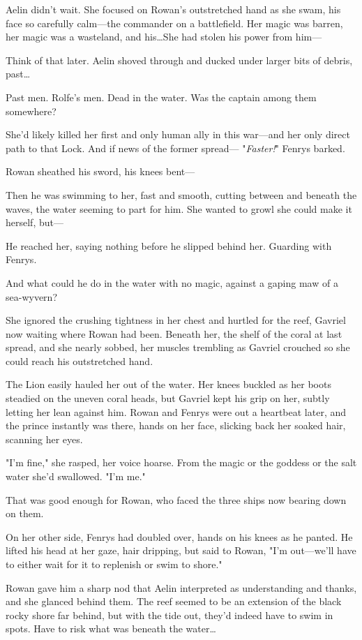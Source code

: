 Aelin didn't wait.
She focused on Rowan's outstretched hand as she swam, his face so carefully calm---the commander on a battlefield.
Her magic was barren, her magic was a wasteland, and his\ldots She had stolen his power from him---

Think of that later.
Aelin shoved through and ducked under larger bits of debris, past\ldots{}

Past men.
Rolfe's men.
Dead in the water.
Was the captain among them somewhere?

She'd likely killed her first and only human ally in this war---and her only direct path to that Lock.
And if news of the former spread--- "\emph{Faster!}" Fenrys barked.

Rowan sheathed his sword, his knees bent---

Then he was swimming to her, fast and smooth, cutting between and beneath the waves, the water seeming to part for him.
She wanted to growl she could make it herself, but---

He reached her, saying nothing before he slipped behind her.
Guarding with Fenrys.

And what could he do in the water with no magic, against a gaping maw of a sea-wyvern?

She ignored the crushing tightness in her chest and hurtled for the reef, Gavriel now waiting where Rowan had been.
Beneath her, the shelf of the coral at last spread, and she nearly sobbed, her muscles trembling as Gavriel crouched so she could reach his outstretched hand.

The Lion easily hauled her out of the water.
Her knees buckled as her boots steadied on the uneven coral heads, but Gavriel kept his grip on her, subtly letting her lean against him.
Rowan and Fenrys were out a heartbeat later, and the prince instantly was there, hands on her face, slicking back her soaked hair, scanning her eyes.

"I'm fine," she rasped, her voice hoarse.
From the magic or the goddess or the salt water she'd swallowed.
"I'm me."

That was good enough for Rowan, who faced the three ships now bearing down on them.

On her other side, Fenrys had doubled over, hands on his knees as he panted.
He lifted his head at her gaze, hair dripping, but said to Rowan, "I'm out---we'll have to either wait for it to replenish or swim to shore."

Rowan gave him a sharp nod that Aelin interpreted as understanding and thanks, and she glanced behind them.
The reef seemed to be an extension of the black rocky shore far behind, but with the tide out, they'd indeed have to swim in spots.
Have to risk what was beneath the water\ldots{}

